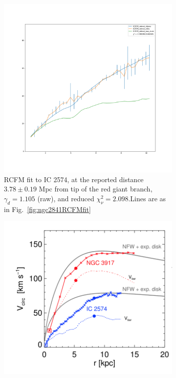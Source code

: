 \documentclass[reprint,%
 amsmath,amssymb,
 aps,
]{revtex4-1}
\begin{document}
 
 \begin{figure}[ht] 
  \begin{subfigure}[b]{0.5\linewidth}
    \centering
    \includegraphics[width=0.95\linewidth]{figures/IC2574_rotmod_XueSofue.png} 
    \caption{  RCFM fit to IC 2574, 
      at the reported   distance $3.78 ± 0.19 $ Mpc from tip of the red giant branch, $\gamma_d = 1.105 $ (raw), and reduced $\chi^2_\nu = 2.098  $.Lines are as in Fig.~\ref{fig:ngc2841RCFMfit}
    } 
    \label{fig:IC2574} 
    \vspace{4ex}
  \end{subfigure}%
  \begin{subfigure}[b]{0.5\linewidth}
    \centering
    \includegraphics[width=0.95\linewidth]{figures/Navarro2017Fig3.png} 

\end{subfigure}
\end{figure}
\end{document}
